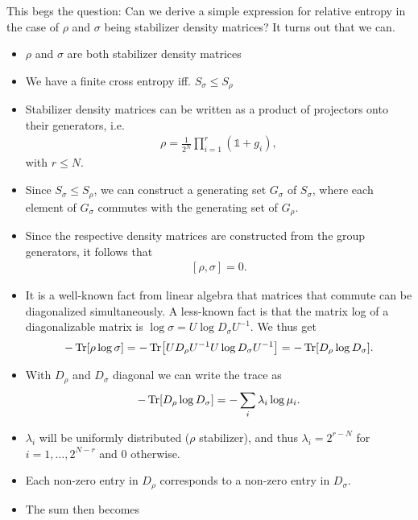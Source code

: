 This begs the question: Can we derive a simple expression for relative entropy
in the case of $\rho$ and $\sigma$ being stabilizer density matrices?
It turns out that we can.

\begin{itemize}
  \item $\rho$ and $\sigma$ are both stabilizer density matrices
  \item We have a finite cross entropy iff. $S_\sigma \leq S_\rho$
  \item Stabilizer density matrices can be written as a product of projectors
    onto their generators, i.e.
    \begin{align}
    \rho = \frac{1}{2^N}\prod_{i=1}^r \left(\mathds{1} + g_i\right)
    ,\end{align}
    with $r\leq N$.
  \item Since $S_\sigma \leq S_\rho$, we can construct a generating set
    $G_\sigma$ of $S_\sigma$, where each element of $G_\sigma$ commutes with
    the generating set of $G_\rho$.
  \item Since the respective density matrices are constructed from the group
    generators, it follows that
    \begin{align}
      \left[\rho, \sigma\right] = 0
    .\end{align}
  \item It is a well-known fact from linear algebra that matrices that commute
    can be diagonalized simultaneously. A less-known fact is that the matrix
    log of a diagonalizable matrix is $\log\sigma = U \log D_\sigma U^{-1}$. We
    thus get
    \begin{align}
      -\Tr[\rho \log\sigma] = -\Tr[U D_\rho U^{-1} U \log D_\sigma U^{-1}] =
      -\Tr[D_\rho \log D_\sigma] 
    .\end{align}
  \item With $D_\rho$ and $D_\sigma$ diagonal we can write the trace as
    \begin{align}
      -\Tr[D_\rho \log D_\sigma] = -\sum_i \lambda_i \log \mu_i
    .\end{align}
  \item $\lambda_i$ will be uniformly distributed ($\rho$ stabilizer), and thus
    $\lambda_i = 2^{r-N}$ for $i=1,\ldots,2^{N-r}$ and $0$ otherwise.
  \item Each non-zero entry in $D_\rho$ corresponds to a non-zero entry in
    $D_\sigma$. 
  \item The sum then becomes
    \begin{align}

\end{align}
\end{itemize}
